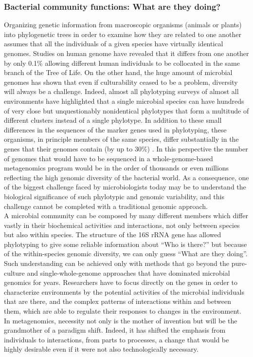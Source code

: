 \subsubsection{Bacterial community functions: What are they doing?}
Organizing genetic information from macroscopic organisms (animals or plants) into phylogenetic trees in order to examine how they are related to one another assumes that all the individuals of a given species have virtually identical genomes. Studies on human genome have revealed that it differs from one another by only 0.1\% allowing different human individuals to be collocated in the same branch of the Tree of Life. On the other hand, the huge amount of microbial genomes has shown that even if culturability ceased to be a problem, diversity will always be a challenge. Indeed, almost all phylotyping surveys of almost all environments have highlighted that a single microbial species can have hundreds of very close but unquestionably nonidentical phylotypes that form a multitude of different clusters instead of a single phylotype. In addition to these small differences in the sequences of the marker genes used in phylotyping, these organisms, in principle members of the same species, differ substantially in the genes that their genomes contain (by up to 30\%) \cite{thompson2005genotypic}. In this perspective the number of genomes that would have to be sequenced in a whole-genome-based metagenomics program would be in the order of thousands or even millions reflecting the high genomic diversity of the bacterial world. As a consequence, one of the biggest challenge faced by microbiologists today may be to understand the biological significance of such phylotypic and genomic variability, and this challenge cannot be completed with a traditional genomic approach.\\
A microbial community can be composed by many different members which differ vastly in their biochemical activities and interactions, not only between species but also within species. The structure of the 16S rRNA gene has allowed phylotyping to give some reliable information about ``Who is there?'' but because of the within-species genomic diversity, we can only guess ``What are they doing''. Such understanding can be achieved only with methods that go beyond the pure-culture and single-whole-genome approaches that have dominated microbial genomics for years. Researchers have to focus directly on the genes in order to characterize environments by the potential activities of the microbial individuals that are there, and the complex patterns of interactions within and between them, which are able to regulate their responses to changes in the environment. In metagenomics, necessity not only is the mother of invention but will be the grandmother of a paradigm shift. Indeed, it has shifted the emphasis from individuals to interactions, from parts to processes, a change that would be highly desirable even if it were not also technologically necessary.\\
